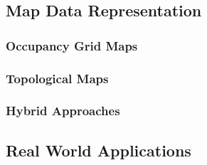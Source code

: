 \subsection{Map Data Representation}


\subsubsection{Occupancy Grid Maps}


\subsubsection{Topological Maps}


\subsubsection{Hybrid Approaches}


\subsection{Real World Applications}



